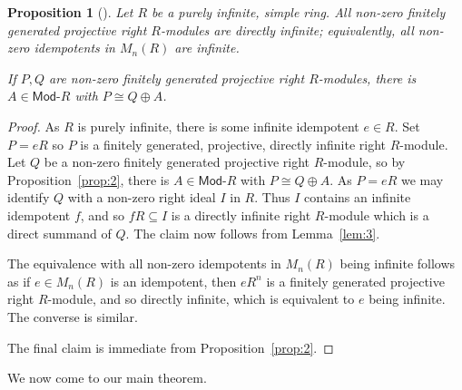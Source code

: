 \documentclass[a4paper,12pt]{article}
\theoremstyle{plain}
\newtheorem{proposition}{Proposition}[section]
\theoremstyle{definition}
\renewcommand{\mod}{\textsf{Mod-}}
\begin{document}
\begin{proposition}[{\cite[Proposition~1.5]{agp}}]\label{prop:3}
Let $R$ be a purely infinite, simple ring.  All non-zero finitely generated projective right $R$-modules
are directly infinite; equivalently, all non-zero idempotents in $M_n(R)$ are infinite.

If $P,Q$ are non-zero finitely generated projective right $R$-modules, there is $A\in\mod R$ with
$P\cong Q\oplus A$.
\end{proposition}
\begin{proof}
As $R$ is purely infinite, there is some infinite idempotent $e\in R$.  Set $P = eR$ so $P$ is a finitely
generated, projective, directly infinite right $R$-module.  Let $Q$ be a non-zero finitely generated projective right $R$-module, so by Proposition~\ref{prop:2}, there is $A\in\mod R$ with $P\cong Q\oplus A$.  As $P=eR$
we may identify $Q$ with a non-zero right ideal $I$ in $R$.  Thus $I$ contains an infinite
idempotent $f$, and so $fR \subseteq I$ is a directly infinite right $R$-module which is a direct summand
of $Q$.  The claim now follows from Lemma~\ref{lem:3}.

The equivalence with all non-zero idempotents in $M_n(R)$ being infinite follows as if $e\in M_n(R)$ is
an idempotent, then $eR^n$ is a finitely generated projective right $R$-module, and so directly infinite,
which is equivalent to $e$ being infinite.  The converse is similar.

The final claim is immediate from Proposition~\ref{prop:2}.
\end{proof}

We now come to our main theorem.
\end{document}
